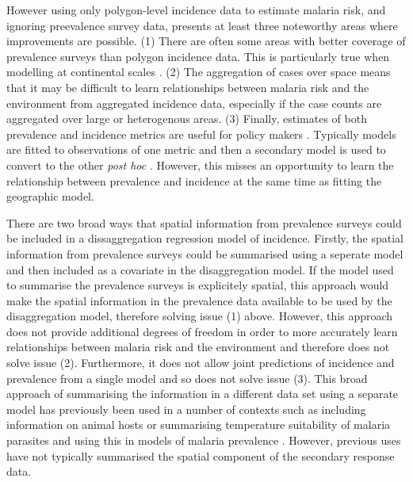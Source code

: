 \documentclass{statsoc}
\begin{document}
However using only polygon-level incidence data to estimate malaria risk, and ignoring preevalence survey data, presents at least three noteworthy areas where improvements are possible. 
(1) There are often some areas with better coverage of prevalence surveys than polygon incidence data. This is particularly true when modelling at continental scales \citep{weiss2019mapping, battle2019mapping}.
(2) The aggregation of cases over space means that it may be difficult to learn relationships between malaria risk and the environment from aggregated incidence data, especially if the case counts are aggregated over large or heterogenous areas.
(3) Finally, estimates of both prevalence and incidence metrics are useful for policy makers \citep{cohen2017mapping}. Typically models are fitted to observations of one metric and then a secondary model is used to convert to the other \emph{post hoc} \citep{battle2019mapping, bhatt2015effect}. However, this misses an opportunity to learn the relationship between prevalence and incidence at the same time as fitting the geographic model.

There are two broad ways that spatial information from prevalence surveys could be included in a dissaggregation regression model of incidence.
Firstly, the spatial information from prevalence surveys could be summarised using a seperate model and then included as a covariate in the disaggregation model.
If the model used to summarise the prevalence surveys is explicitely spatial, this approach would make the spatial information in the prevalence data available to be used by the disaggregation model, therefore solving issue (1) above.
However, this approach does not provide additional degrees of freedom in order to more accurately learn relationships between malaria risk and the environment and therefore does not solve issue (2).
Furthermore, it does not allow joint predictions of incidence and prevalence from a single model and so does not solve issue (3).
This broad approach of summarising the information in a different data set using a separate model has previously been used in a number of contexts such as including information on animal hosts \citep{shearer2016estimating} or summarising temperature suitability of malaria parasites \citep{weiss2014air} and using this in models of malaria prevalence \citep{bhatt2015effect, weiss2019mapping}.
However, previous uses have not typically summarised the spatial component of the secondary response data.
\end{document}
